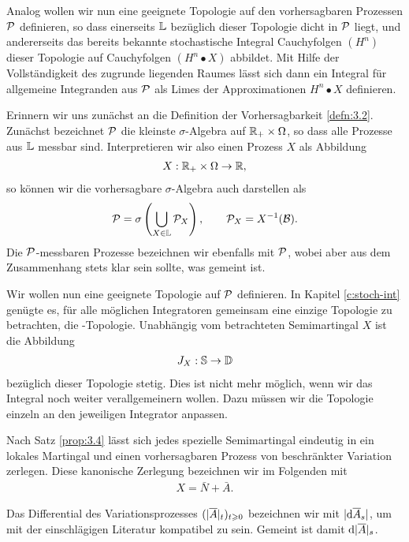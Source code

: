 Analog wollen wir nun eine geeignete Topologie auf den vorhersagbaren Prozessen
$\mathcal{P}$ definieren, so dass einerseits $\mathbb{L}$ bezüglich dieser Topologie dicht in
$\mathcal{P}$ liegt, und andererseits das bereits bekannte stochastische Integral
Cauchyfolgen $(H^n)$ dieser Topologie auf Cauchyfolgen $(H^n\bullet X)$
abbildet. Mit Hilfe der Vollständigkeit des zugrunde liegenden Raumes lässt sich
dann ein Integral für allgemeine Integranden aus $\mathcal{P}$ als Limes der
Approximationen $H^n\bullet X$ definieren.
 
 Erinnern wir uns zunächst an die Definition der Vorhersagbarkeit
\ref{defn:3.2}. Zunächst bezeichnet $\mathcal{P}$ die kleinste $\sigma$-Algebra auf
$\mathbb{R}_+\times\Omega$, so dass alle Prozesse aus $\mathbb{L}$ messbar sind.
Interpretieren wir also einen Prozess $X$ als Abbildung
\begin{align*}
X: \mathbb{R}_+\times\Omega\to \mathbb{R},
\end{align*} 
so können wir die vorhersagbare $\sigma$-Algebra auch darstellen als
\begin{align*}
\mathcal{P} = \sigma\left(\bigcup_{X\in\mathbb{L}} \mathcal{P}_X\right),\qquad \mathcal{P}_X = X^{-1}(\mathcal{B}). 
\end{align*}
Die $\mathcal{P}$-messbaren Prozesse bezeichnen wir ebenfalls mit $\mathcal{P}$, wobei aber
aus dem Zusammenhang stets klar sein sollte, was gemeint ist.

Wir wollen nun eine geeignete Topologie auf $\mathcal{P}$ definieren. 
In Kapitel \ref{c:stoch-int} genügte es, für alle möglichen Integratoren
gemeinsam eine einzige Topologie zu betrachten, die \ucp-Topologie. Unabhängig
vom betrachteten Semimartingal $X$ ist die Abbildung
\begin{align*}
J_X : \mathbb{S} \to \mathbb{D}
\end{align*}
bezüglich dieser Topologie stetig. Dies ist nicht mehr möglich, wenn wir das
Integral noch weiter verallgemeinern wollen. Dazu müssen wir die Topologie
einzeln an den jeweiligen Integrator anpassen.

\begin{rem*}
\begin{remenum}
\item
Nach Satz \ref{prop:3.4} lässt sich jedes spezielle Semimartingal eindeutig in
ein lokales Martingal und einen vorhersagbaren Prozess von beschränkter Variation zerlegen. Diese kanonische
Zerlegung bezeichnen wir im Folgenden mit
\begin{align*}
X = \bar{N}+\bar{A}.
\end{align*}
\item Das Differential des Variationsprozesses $(\lvert\overline{A}\rvert_t)_{t\geqslant 0}$
bezeichnen wir mit $\lvert\mathrm{d} \overline{A}_s\rvert$, um mit der einschlägigen Literatur
kompatibel zu sein. Gemeint ist damit $\mathrm{d} \lvert\overline{A}\rvert_s$.\map
\end{remenum}
\end{rem*}

